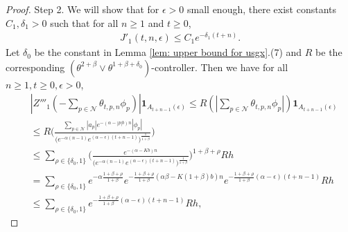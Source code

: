 \documentclass[12pt,a4paper]{amsart}
\theoremstyle{plain}
\theoremstyle{definition}
\numberwithin{equation}{section}
\begin{document}
\begin{proof}
    Step 2.
    We will show that for $\epsilon>0$ small enough, there exist constants $C_1,\delta_1>0$ such that for all $n\geq 1$ and $t\geq 0$,
\begin{align}\label{eq:large rate J1}
    J'_1(t,n,\epsilon)\leq C_1 e^{-\delta_1(t+n)}.
\end{align}
    Let $\delta_0$ be the constant in Lemma \ref{lem: upper bound for usgx}.(7) and $R$ be the corresponding $(\theta^{2+\beta}\vee \theta^{1+\beta+\delta_0})$-controller.
    Then we have for all $n\geq 1, t\geq 0, \epsilon > 0$,
\begin{align}
    & |Z'''_1(-\sum_{p\in \mathcal{N}}\theta_{t,p,n}\phi_p)|\mathbf{1}_{A_{t+n-1}(\epsilon)}
    \leq R(|\sum_{p\in\mathcal{N}}\theta_{t,p,n}\phi_p|)\mathbf{1}_{A_{t+n-1}(\epsilon)}
    \\&\leq R \Big(\frac{\sum_{p\in\mathcal{N}}|a_p|e^{-(\alpha-|p|b)n}|\phi_p|}{\big(e^{-\alpha(n-1)}e^{(\alpha-\epsilon)(t+n-1)}\big)^{\frac{1}{1+\beta}}}\Big)
    \\&\leq \sum_{\rho\in\{\delta_0,1\}}\Big(\frac{e^{-(\alpha-Kb)n}}{\big(e^{-\alpha(n-1)}e^{(\alpha-\epsilon)(t+n-1)}\big)^{\frac{1}{1+\beta}}}\Big)^{1+\beta+\rho}Rh
    \\&=\sum_{\rho\in\{\delta_0,1\}}e^{-\alpha\frac{1+\beta+\rho}{1+\beta}}e^{-\frac{1+\beta+\rho}{1+\beta}(\alpha\beta-K(1+\beta)b)n}e^{-\frac{1+\beta+\rho}{1+\beta}(\alpha-\epsilon)(t+n-1)}Rh
    \\&\leq \sum_{\rho\in\{\delta_0,1\}}e^{-\frac{1+\beta+\rho}{1+\beta}(\alpha-\epsilon)(t+n-1)}Rh,
\end{align}

\end{proof}
\end{document}
